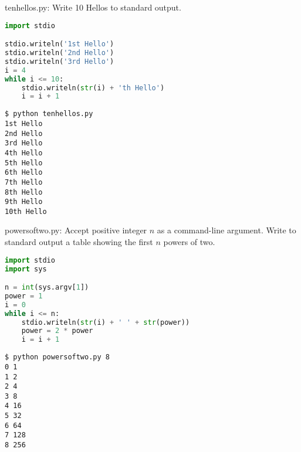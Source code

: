 \documentclass[8pt,a4paper,compress]{beamer}
\begin{document}
\begin{frame}[fragile]
\pause

\begin{framed}
\tiny tenhellos.py: Write 10 Hellos to standard output.
\end{framed}

\begin{lstlisting}[language=Python]
import stdio

stdio.writeln('1st Hello')
stdio.writeln('2nd Hello')
stdio.writeln('3rd Hello')
i = 4
while i <= 10:
    stdio.writeln(str(i) + 'th Hello')
    i = i + 1
\end{lstlisting}

\pause

\begin{lstlisting}[language={}]
$ python tenhellos.py 
1st Hello
2nd Hello
3rd Hello
4th Hello
5th Hello
6th Hello
7th Hello
8th Hello
9th Hello
10th Hello
\end{lstlisting}
\end{frame}

\begin{frame}[fragile]
\pause

\begin{framed}
\tiny powersoftwo.py: Accept positive integer $n$ as a command-line argument. Write to standard output a table showing the first $n$ powers of two.
\end{framed}

\begin{lstlisting}[language=Python]
import stdio
import sys

n = int(sys.argv[1])
power = 1
i = 0
while i <= n:
    stdio.writeln(str(i) + ' ' + str(power))    
    power = 2 * power
    i = i + 1
\end{lstlisting}

\pause

\begin{lstlisting}[language={}]
$ python powersoftwo.py 8
0 1
1 2
2 4
3 8
4 16
5 32
6 64
7 128
8 256
\end{lstlisting}
\end{frame}
\end{document}
